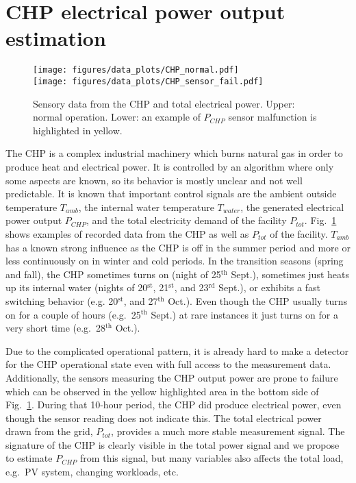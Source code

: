 \documentclass[runningheads, envcountsame, a4paper]{llncs}
\newcommand{\m}[1]{\ensuremath{\mathrm{#1}}}
\begin{document}
\section{CHP electrical power output estimation}\label{sec:CHP}
\begin{figure}[tbh]
    \centering
    \texttt{[image: figures/data\_plots/CHP\_normal.pdf]}\\
    \texttt{[image: figures/data\_plots/CHP\_sensor\_fail.pdf]}
\caption{Sensory data from the CHP and total electrical power. Upper: normal operation. Lower: an example of $P_{CHP}$ sensor malfunction is highlighted in yellow.}
\label{fig:CHP_data}
\end{figure}


The CHP is a complex industrial machinery which burns natural gas in order to produce heat and electrical power.
It is controlled by an algorithm where only some aspects are known, so its behavior is mostly unclear and not well predictable.  
It is known that important control signals are the ambient outside temperature $T_{amb}$, the  internal water temperature $T_{water}$, the generated electrical power output $P_{CHP}$, and the total electricity demand of the facility $P_{tot}$.
Fig.~\ref{fig:CHP_data} shows examples of recorded data from the CHP as well as  $P_{tot}$ of the facility.
 $T_{amb}$ has a known strong influence as the CHP is off in the summer period and more or less continuously on in winter and cold periods.
In the transition seasons (spring and fall), the CHP sometimes turns on (night of 25$^\m{th}$ Sept.), sometimes just heats up its internal water (nights of 20$^\m{st}$, 21$^\m{st}$, and 23$^\m{rd}$ Sept.), or  exhibits a fast switching behavior (e.g. 20$^\m{st}$, and 27$^\m{th}$ Oct.).
Even though the CHP usually turns on for a couple of hours (e.g.\ 25$^\m{th}$ Sept.) at rare instances it just turns on for a very short time (e.g.\ 28$^\m{th}$ Oct.).

Due to the complicated operational pattern, it is already hard to make a detector for the CHP operational state even with full access to the measurement data. 
Additionally, the sensors measuring the CHP output power are prone to failure which can be observed in the yellow highlighted area in the bottom side of Fig.~\ref{fig:CHP_data}. 
During that 10-hour period, the CHP did produce electrical power, even though the sensor reading does not indicate this. 
The total electrical power drawn from the grid, $P_{tot}$, provides a much more stable measurement signal. 
The signature of the CHP is clearly visible in the total power signal and we propose to estimate  $P_{CHP}$ from this signal,  but many variables also affects the total load, e.g.\ PV system, changing workloads, etc.
\end{document}
